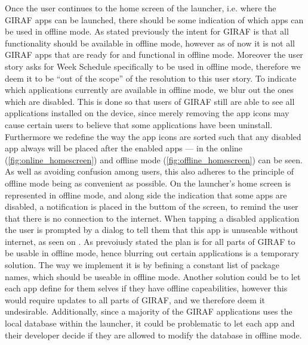 \bigskip

Once the user continues to the home screen of the launcher, i.e. where the GIRAF apps can be launched, there should be some indication of which apps can be used in offline mode. 
As stated previously the intent for GIRAF is that all functionality should be available in offline mode, however as of now it is not all GIRAF apps that are ready for and functional in offline mode.
Moreover the user story asks for Week Schedule specifically to be used in offline mode, therefore we deem it to be \enquote{out of the scope} of the resolution to this user story.
To indicate which applications currently are available in offline mode, we blur out the ones which are disabled.
This is done so that users of GIRAF still are able to see all applications installed on the device, since merely removing the app icons may cause certain users to believe that some applications have been uninstall.
Furthermore we redefine the way the app icons are sorted such that any disabled app always will be placed after the enabled apps --- in  the online (\ref{fig:online_homescreen}) and offline mode (\ref{fig:offline_homescreen}) can be seen.
As well as avoiding confusion among users, this also adheres to the principle of offline mode being as convenient as possible.
On  the launcher's home screen is represented in offline mode, and along side the indication that some apps are disabled, a notification is placed in the buttom of the screen, to remind the user that there is no connection to the internet.
When tapping a disabled application the user is prompted by a dialog to tell them that this app is unuseable without internet, as seen on . 
As prevoiusly stated the plan is for all parts of GIRAF to be usable in offline mode, hence blurring out certain applications is a temporary solution.
The way we implement it is by befining a constant list of package names, which should be useable in offline mode.
Another solution could be to let each app define for them selves if they have offline capeabilities, however this would require updates to all parts of GIRAF, and we therefore deem it undesirable.
Additionally, since a majority of the GIRAF applications uses the local database within the launcher, it could be problematic to let each app and their developer decide if they are allowed to modify the database in offline mode.

